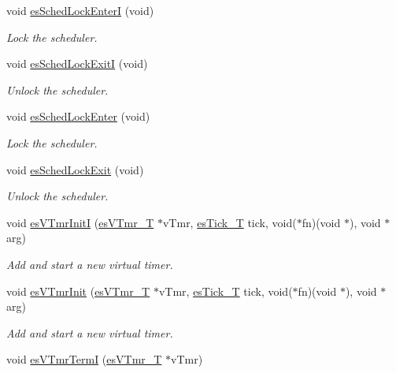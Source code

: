 \begin{DoxyCompactItemize}
void \hyperlink{group__kern__impl_ga1e60d9df6ad1712ed57cd4ca038fcad2}{es\-Sched\-Lock\-Enter\-I} (void)
\begin{DoxyCompactList}\small\item\em Lock the scheduler. \end{DoxyCompactList}\item 
void \hyperlink{group__kern__impl_gaddd9b2fcbc03765f63f81b64e6663934}{es\-Sched\-Lock\-Exit\-I} (void)
\begin{DoxyCompactList}\small\item\em Unlock the scheduler. \end{DoxyCompactList}\item 
void \hyperlink{group__kern__impl_ga4b70a0e213b791b4e51840352d144a22}{es\-Sched\-Lock\-Enter} (void)
\begin{DoxyCompactList}\small\item\em Lock the scheduler. \end{DoxyCompactList}\item 
void \hyperlink{group__kern__impl_gac4c263203fcf700d96fe21782cfde219}{es\-Sched\-Lock\-Exit} (void)
\begin{DoxyCompactList}\small\item\em Unlock the scheduler. \end{DoxyCompactList}\item 
void \hyperlink{group__kern__impl_ga45fe650eac73e7fe203cc81565401555}{es\-V\-Tmr\-Init\-I} (\hyperlink{group__kern__intf_ga3c020f0ca54ff412bc1d1505502d2afc}{es\-V\-Tmr\-\_\-\-T} $\ast$v\-Tmr, \hyperlink{group__kern__intf_ga844873888c186ee81eb66620dadb0451}{es\-Tick\-\_\-\-T} tick, void($\ast$fn)(void $\ast$), void $\ast$arg)
\begin{DoxyCompactList}\small\item\em Add and start a new virtual timer. \end{DoxyCompactList}\item 
void \hyperlink{group__kern__impl_gad932cf00aec4ba03a0df02ccc493c4c2}{es\-V\-Tmr\-Init} (\hyperlink{group__kern__intf_ga3c020f0ca54ff412bc1d1505502d2afc}{es\-V\-Tmr\-\_\-\-T} $\ast$v\-Tmr, \hyperlink{group__kern__intf_ga844873888c186ee81eb66620dadb0451}{es\-Tick\-\_\-\-T} tick, void($\ast$fn)(void $\ast$), void $\ast$arg)
\begin{DoxyCompactList}\small\item\em Add and start a new virtual timer. \end{DoxyCompactList}\item 
void \hyperlink{group__kern__impl_ga96bb2c81f649c0305dfd08d1c79b2e37}{es\-V\-Tmr\-Term\-I} (\hyperlink{group__kern__intf_ga3c020f0ca54ff412bc1d1505502d2afc}{es\-V\-Tmr\-\_\-\-T} $\ast$v\-Tmr)

\end{DoxyCompactItemize}
